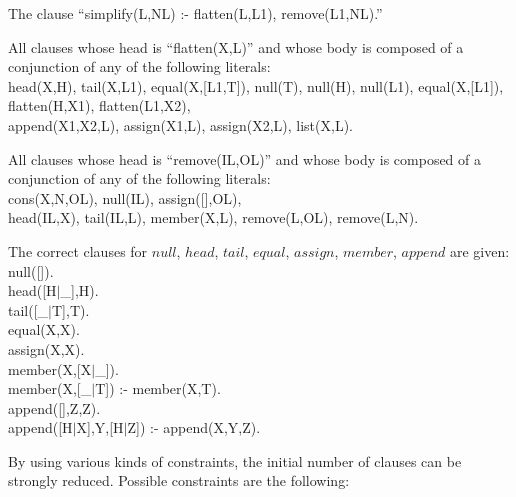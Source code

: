 \begin{itemize}
\begin{item}
The clause ``simplify(L,NL) :- flatten(L,L1), remove(L1,NL).''
\end{item}
\begin{item}
All clauses whose head is ``flatten(X,L)'' and whose body is composed
of a conjunction of any of the following literals:\\
 
\noindent
head(X,H), tail(X,L1), equal(X,[L1,T]),
null(T),
null(H),
null(L1),
equal(X,[L1]),\\
flatten(H,X1), flatten(L1,X2),\\
append(X1,X2,L), assign(X1,L),
assign(X2,L),
list(X,L).\\
\end{item}
\begin{item}
All clauses whose head is ``remove(IL,OL)'' and whose body is composed
of a conjunction of any of the following literals:\\
 
\noindent
cons(X,N,OL),
null(IL), assign([],OL),\\
head(IL,X), tail(IL,L), member(X,L),
remove(L,OL), remove(L,N).\\
\end{item}
\begin{item}
The correct clauses for $null$,
$head$, $tail$,
$equal$, $assign$, 
$member$, $append$ 
are given:\\
 
\noindent
null([]).\\
head([H$|$\_],H).\\
tail([\_$|$T],T).\\
equal(X,X).\\
assign(X,X).\\
member(X,[X$|$\_]).\\
member(X,[\_$|$T]) :- member(X,T).\\
append([],Z,Z).\\
append([H$|$X],Y,[H$|$Z]) :- append(X,Y,Z).
\end{item}
\end{itemize}
 
\noindent
By using various kinds of constraints, the initial number of clauses
can be strongly reduced. Possible constraints are the following:
 
